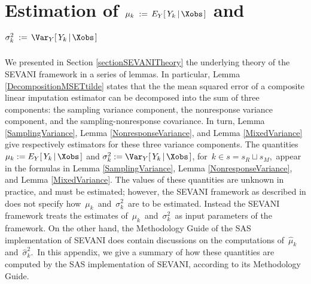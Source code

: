 

\section{Estimation of
\;$\mu_{k} \;:=\, E_{Y}\!\left[\,Y_{k}\left\vert\,\Xobs\right.\right]$\;
and
\;$\sigma_{k}^{2} \;:=\, \Var_{Y}\!\left[\,Y_{k}\left\vert\,\Xobs\right.\right]$
}

We presented in Section \ref{sectionSEVANITheory} the underlying theory
of the SEVANI framework \cite{Beaumont2011} in a series of lemmas.
\vskip 0.2cm
\noindent
In particular, Lemma \ref{DecompositionMSETtilde} states that the the mean squared error
of a composite linear imputation estimator can be decomposed into the sum of three components:
the sampling variance component, the nonresponse variance component, and
the sampling-nonresponse covariance.
In turn, Lemma \ref{SamplingVariance}, Lemma \ref{NonresponseVariance}, and Lemma \ref{MixedVariance}
give respectively estimators for these three variance components.
\vskip 0.2cm
\noindent
The quantities
\;$\mu_{k} := E_{Y}\!\left[\,Y_{k}\left\vert\,\Xobs\right.\right]$\;
and
\;$\sigma_{k}^{2} := \Var_{Y}\!\left[\,Y_{k}\left\vert\,\Xobs\right.\right]$,\;
for \,$k \in s = s_{R} \sqcup s_{M}$,\,
appear in the formulas in
Lemma \ref{SamplingVariance}, Lemma \ref{NonresponseVariance}, and Lemma \ref{MixedVariance}.
The values of these quantities are unknown in practice, and must be estimated;
however, the SEVANI framework as described in \cite{Beaumont2011} does not specify how
\,$\mu_{k}$\, and \,$\sigma_{k}^{2}$\,
are to be estimated.
Instead the SEVANI framework \cite{Beaumont2011} treats the estimates of
\,$\mu_{k}$\, and \,$\sigma_{k}^{2}$\,
as input parameters of the framework.
\vskip 0.2cm
\noindent
On the other hand, the Methodology Guide of the SAS implementation of SEVANI does
contain discussions on the computations of
\,$\widehat{\mu}_{k}$\, and \,$\widehat{\sigma}_{k}^{2}$.\,
In this appendix, we give a summary of how these quantities are computed
by the SAS implementation of SEVANI, according to its Methodology Guide.


